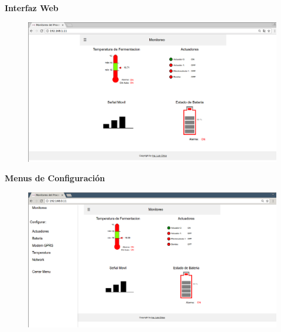 \documentclass[11pt]{beamer}
\begin{document}
\begin{frame}{\textbf{\LARGE{Interfaz Web}}}
  \vspace{-.7cm}
  \begin{figure}[H]
    {\includegraphics[width=1\textwidth]{./imagenes/web_monitoreo.png}}
  \end{figure}	
\end{frame}

\begin{frame}{\textbf{\LARGE{Menus de Configuración}}}
  \vspace{-.7cm}
  \begin{figure}[H]
    {\includegraphics[width=1\textwidth]{./imagenes/web_menus.png}}
  \end{figure}	
\end{frame}
\end{document}
